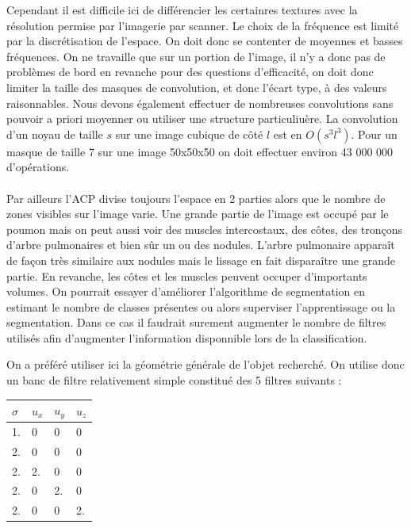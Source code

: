 \documentclass{article}
\begin{document}
Cependant il est difficile ici de différencier les certainres textures avec la résolution permise par l'imagerie par scanner. Le choix de la fréquence est limité par la discrétisation de l'espace. On doit donc se contenter de moyennes et basses fréquences. On ne travaille que sur un portion de l'image, il n'y a donc pas de problèmes de bord en revanche pour des questions d'efficacité, on doit donc limiter la taille des masques de convolution, et donc l'écart type, à des valeurs raisonnables. Nous devons également effectuer de nombreuses convolutions sans pouvoir a priori moyenner ou utiliser une structure particuliuère. La convolution d'un noyau de taille $s$ sur une image cubique de côté $l$ est en $O(s^3 l^3)$. Pour un masque de taille 7 sur une image 50x50x50 on doit effectuer environ 43 000 000 d'opérations. 
\\\\

Par ailleurs l'ACP divise toujours l'espace en 2 parties alors que le nombre de zones visibles sur l'image varie. Une grande partie de l'image est occupé par le poumon mais on peut aussi voir des muscles intercostaux, des côtes, des tronçons d'arbre pulmonaires et bien sûr un ou des nodules.
L'arbre pulmonaire apparaît de façon très similaire aux nodules mais le lissage en fait disparaître une grande partie.
En revanche, les côtes et les muscles peuvent occuper d'importants volumes. On pourrait essayer d'améliorer l'algorithme de segmentation en estimant le nombre de classes présentes ou alors superviser l'apprentissage ou la segmentation. Dans ce cas il faudrait surement augmenter le nombre de filtres utilisés afin d'augmenter l'information disponnible lors de la classification.

On a préféré utiliser ici la géométrie générale de l'objet recherché.
On utilise donc un banc de filtre relativement simple constitué des 5 filtres suivants :
\begin{center}
\begin{tabular}{|llll|}
  \hline
   $\sigma$  & $u_x$ & $u_y $ & $u_z$ \\
  \hline
   1. & 0   & 0  & 0   \\
   2. & 0   & 0  & 0   \\
   2. & 2.  & 0  & 0   \\
   2. & 0  & 2.  & 0   \\
   2. & 0   & 0  & 2.  \\
  \hline
\end{tabular}
\end{center}
\end{document}
